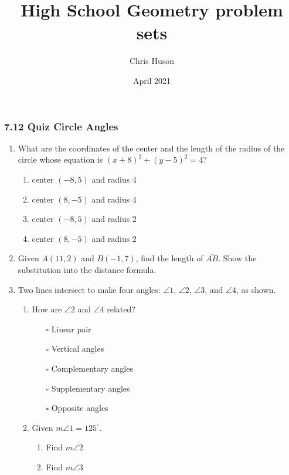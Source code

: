 \documentclass[12pt, twoside]{article}
\title{High School Geometry problem sets}
\author{Chris Huson}
\date{April 2021}
\begin{document}
\subsubsection*{7.12 Quiz Circle Angles}
\begin{enumerate}
\item What are the coordinates of the center and the length of the radius of the circle whose equation is $(x+8)^2+(y-5)^2=4$?
  \begin{enumerate}[itemsep=0.25cm]
    \item center $(-8,5)$ and radius 4
    \item center $(8,-5)$ and radius 4
    \item center $(-8,5)$ and radius 2
    \item center $(8,-5)$ and radius 2
  \end{enumerate}

\newpage
\item Given $A(11,2)$ and $B(-1,7)$, find the length of $\overline{AB}$. Show the substitution into the distance formula.

\newpage
\item Two lines intersect to make four angles: $\angle 1$, $\angle 2$, $\angle 3$, and $\angle 4$, as shown.

  \begin{multicols}{2}  
    \begin{enumerate}
      \item How are $\angle 2$ and $\angle 4$ related?
        \begin{itemize}
          \item[$\square$] Linear pair
          \item[$\square$] Vertical angles
          \item[$\square$] Complementary angles
          \item[$\square$] Supplementary angles
          \item[$\square$] Opposite angles
        \end{itemize}
      \item Given $m\angle 1 = 125^\circ$.
        \begin{enumerate}
          \item Find $m\angle 2$ \vspace{0.5cm}
          \item Find $m\angle 3$ \vspace{2cm}
        \end{enumerate} 
        \end{enumerate}
  \end{multicols}
  

\end{enumerate}
\end{document}

